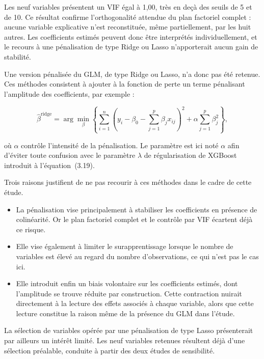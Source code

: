 Les neuf variables présentent un VIF égal à 1,00, très en deçà des seuils de 5 et de 10. Ce résultat confirme l'orthogonalité attendue du plan factoriel complet : aucune variable explicative n'est reconstituée, même partiellement, par les huit autres. Les coefficients estimés peuvent donc être interprétés individuellement, et le recours à une pénalisation de type Ridge ou Lasso n'apporterait aucun gain de stabilité.

Une version pénalisée du GLM, de type Ridge ou Lasso, n'a donc pas été retenue. Ces méthodes consistent à ajouter à la fonction de perte un terme pénalisant l'amplitude des coefficients, par exemple :

\begin{equation}
\hat{\beta}^{\text{ridge}} = \arg\min_{\beta} 
\left\{ \sum_{i=1}^{n} \left( y_i - \beta_0 - \sum_{j=1}^{p} \beta_j x_{ij} \right)^2 
+ \alpha \sum_{j=1}^{p} \beta_j^2 \right\},
\label{eq:ridge}
\end{equation}

où $\alpha$ contrôle l'intensité de la pénalisation. Le paramètre est ici noté $\alpha$ 
afin d'éviter toute confusion avec le paramètre $\lambda$ de régularisation de XGBoost 
introduit à l'équation~(3.19).

Trois raisons justifient de ne pas recourir à ces méthodes dans le cadre de cette étude.

\begin{itemize}
  \item La pénalisation vise principalement à stabiliser les coefficients en présence de 
        colinéarité. Or le plan factoriel complet et le contrôle par VIF écartent déjà ce 
        risque.
  \item Elle vise également à limiter le surapprentissage lorsque le nombre de variables 
        est élevé au regard du nombre d'observations, ce qui n'est pas le cas ici.
  \item Elle introduit enfin un biais volontaire sur les coefficients estimés, dont 
        l'amplitude se trouve réduite par construction. Cette contraction nuirait 
        directement à la lecture des effets associés à chaque variable, alors que cette 
        lecture constitue la raison même de la présence du GLM dans l'étude.
\end{itemize}

La sélection de variables opérée par une pénalisation de type Lasso présenterait par 
ailleurs un intérêt limité. Les neuf variables retenues résultent déjà d'une sélection 
préalable, conduite à partir des deux études de sensibilité.

